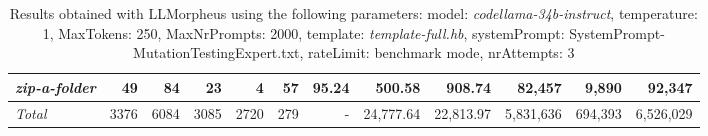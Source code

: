 \begin{table*}
{\begin{tabular}{l||r|r|r|r|r|r||r|r||r|r|r}
   \hline
   \textit{zip-a-folder} & 49 & 84 & 23 & 4 & 57 & 95.24 & 500.58 & 908.74 & 82,457 & 9,890 & 92,347 \\ 
   \hline
   \textit{Total} & 3376 & 6084 & 3085 & 2720 & 279 & - & 24,777.64  & 22,813.97 & 5,831,636 & 694,393 & 6,526,029 \\ 
 \end{tabular}
 }
 \caption{Results obtained with LLMorpheus using the following parameters: 
   model: \textit{codellama-34b-instruct}, 
   temperature: 1, 
   MaxTokens: 250, 
   MaxNrPrompts: 2000, 
   template: \textit{template-full.hb}, 
   systemPrompt: SystemPrompt-MutationTestingExpert.txt, 
   rateLimit: benchmark mode, 
   nrAttempts: 3  
 }
\end{table*}

